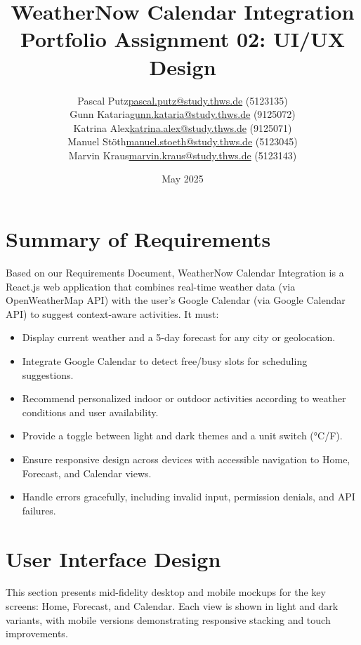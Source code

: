 \documentclass[11pt,a4paper]{article}
\title{WeatherNow Calendar Integration\\\large Portfolio Assignment 02: UI/UX Design}
\author{
  \begin{tabular}{ll}
    Pascal Putz & \href{mailto:pascal.putz@study.thws.de}{pascal.putz@study.thws.de} (5123135)\\
    Gunn Kataria & \href{mailto:gunn.kataria@study.thws.de}{gunn.kataria@study.thws.de} (9125072)\\
    Katrina Alex & \href{mailto:katrina.alex@study.thws.de}{katrina.alex@study.thws.de} (9125071)\\
    Manuel Stöth & \href{mailto:manuel.stoeth@study.thws.de}{manuel.stoeth@study.thws.de} (5123045)\\
    Marvin Kraus & \href{mailto:marvin.kraus@study.thws.de}{marvin.kraus@study.thws.de} (5123143)
  \end{tabular}
}
\date{May 2025}
\begin{document}
\maketitle
\tableofcontents

\newpage

\section{Summary of Requirements}
Based on our Requirements Document, WeatherNow Calendar Integration is a React.js web application that combines real-time weather data (via OpenWeatherMap API) with the user’s Google Calendar (via Google Calendar API) to suggest context-aware activities. It must:

\begin{itemize}[noitemsep]
  \item Display current weather and a 5-day forecast for any city or geolocation.
  \item Integrate Google Calendar to detect free/busy slots for scheduling suggestions.
  \item Recommend personalized indoor or outdoor activities according to weather conditions and user availability.
  \item Provide a toggle between light and dark themes and a unit switch (°C/\textdegree F).
  \item Ensure responsive design across devices with accessible navigation to Home, Forecast, and Calendar views.
  \item Handle errors gracefully, including invalid input, permission denials, and API failures.
\end{itemize}

\section{User Interface Design}
This section presents mid-fidelity desktop and mobile mockups for the key screens: Home, Forecast, and Calendar. Each view is shown in light and dark variants, with mobile versions demonstrating responsive stacking and touch improvements.
\end{document}
